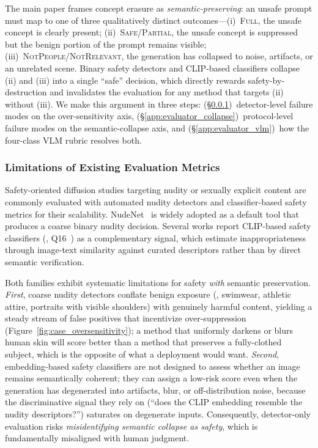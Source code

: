 The main paper frames concept erasure as \emph{semantic-preserving}: an unsafe prompt must map to one of three qualitatively distinct outcomes---(i)~\textsc{Full}, the unsafe concept is clearly present; (ii)~\textsc{Safe}/\textsc{Partial}, the unsafe concept is suppressed but the benign portion of the prompt remains visible; (iii)~\textsc{NotPeople}/\textsc{NotRelevant}, the generation has collapsed to noise, artifacts, or an unrelated scene. Binary safety detectors and CLIP-based classifiers collapse (ii) and (iii) into a single ``safe'' decision, which directly rewards safety-by-destruction and invalidates the evaluation for any method that targets (ii) without (iii). We make this argument in three steps: (\S\ref{app:evaluator_limits})~detector-level failure modes on the over-sensitivity axis, (\S\ref{app:evaluator_collapse})~protocol-level failure modes on the semantic-collapse axis, and (\S\ref{app:evaluator_vlm})~how the four-class VLM rubric resolves both.

\subsubsection{Limitations of Existing Evaluation Metrics}
\label{app:evaluator_limits}

Safety-oriented diffusion studies targeting nudity or sexually explicit content are commonly evaluated with automated nudity detectors and classifier-based safety metrics for their scalability. NudeNet~\citep{notai_nudenet_2019} is widely adopted as a default tool that produces a coarse binary nudity decision. Several works report CLIP-based safety classifiers (\eg, Q16~\citep{schramowski2022can}) as a complementary signal, which estimate inappropriateness through image-text similarity against curated descriptors rather than by direct semantic verification.

Both families exhibit systematic limitations for safety \emph{with} semantic preservation. \emph{First}, coarse nudity detectors conflate benign exposure (\eg, swimwear, athletic attire, portraits with visible shoulders) with genuinely harmful content, yielding a steady stream of false positives that incentivize over-suppression (Figure~\ref{fig:case_oversensitivity}); a method that uniformly darkens or blurs human skin will score better than a method that preserves a fully-clothed subject, which is the opposite of what a deployment would want. \emph{Second}, embedding-based safety classifiers are not designed to assess whether an image remains semantically coherent; they can assign a low-risk score even when the generation has degenerated into artifacts, blur, or off-distribution noise, because the discriminative signal they rely on (``does the CLIP embedding resemble the nudity descriptors?'') saturates on degenerate inputs. Consequently, detector-only evaluation risks \emph{misidentifying semantic collapse as safety}, which is fundamentally misaligned with human judgment.

